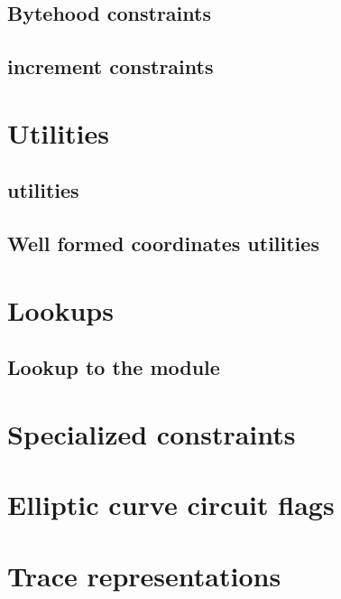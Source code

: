 \subsection{Bytehood constraints}                                           \label{bls: bytehood and accumulator}                                
\subsection{\blsId{} increment constraints}                                 \label{bls: stamp increments}                                        

\section{Utilities}                                                                                                                             
\subsection{\wcpMod{} utilities}                                            \label{bls: wcp utilities}                                           
\subsection{Well formed coordinates utilities}                              \label{bls: well formed coordinates utilities}                       
     
\section{Lookups}     
\subsection{Lookup to the \wcpMod{} module}                                 \label{bls: lookups: wcp}                                            
     
\section{Specialized constraints}                                           \label{bls: specialized constraints}                                 
       
\section{Elliptic curve circuit flags}                                      \label{bls: circuits}                                                
     
\newpage     
\section{Trace representations}                                             \label{bls: trace representations}                                   